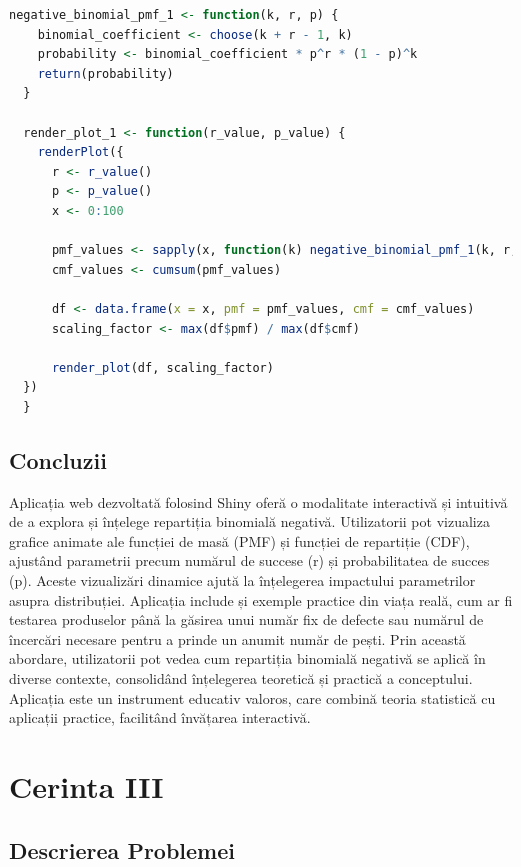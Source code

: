 \documentclass[a4paper,11pt]{article}
\begin{document}
\begin{lstlisting}[language=R]
  negative_binomial_pmf_1 <- function(k, r, p) {
    binomial_coefficient <- choose(k + r - 1, k)
    probability <- binomial_coefficient * p^r * (1 - p)^k
    return(probability)
  }
  
  render_plot_1 <- function(r_value, p_value) {
    renderPlot({
      r <- r_value()
      p <- p_value()
      x <- 0:100
  
      pmf_values <- sapply(x, function(k) negative_binomial_pmf_1(k, r, p))
      cmf_values <- cumsum(pmf_values)
  
      df <- data.frame(x = x, pmf = pmf_values, cmf = cmf_values)
      scaling_factor <- max(df$pmf) / max(df$cmf)
  
      render_plot(df, scaling_factor)
  })
  }
\end{lstlisting}

\subsection*{Concluzii}

Aplicația web dezvoltată folosind Shiny oferă o modalitate interactivă și intuitivă de a explora și înțelege repartiția binomială negativă. Utilizatorii pot vizualiza grafice animate ale funcției de masă (PMF) și funcției de repartiție (CDF), ajustând parametrii precum numărul de succese (r) și probabilitatea de succes (p). Aceste vizualizări dinamice ajută la înțelegerea impactului parametrilor asupra distribuției. Aplicația include și exemple practice din viața reală, cum ar fi testarea produselor până la găsirea unui număr fix de defecte sau numărul de încercări necesare pentru a prinde un anumit număr de pești. Prin această abordare, utilizatorii pot vedea cum repartiția binomială negativă se aplică în diverse contexte, consolidând înțelegerea teoretică și practică a conceptului. Aplicația este un instrument educativ valoros, care combină teoria statistică cu aplicații practice, facilitând învățarea interactivă.
\newpage

\section*{Cerinta III}

\subsection*{Descrierea Problemei}
\end{document}

